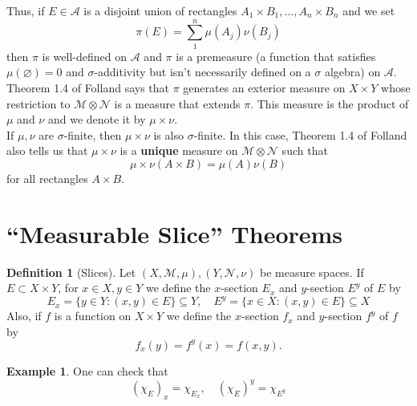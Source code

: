 \documentclass{article}
\theoremstyle{definition}
\newtheorem{exmp}{Example}[section]
\theoremstyle{theorem}
\newtheorem{definition}[theorem]{Definition}
\begin{document}
Thus, if $E \in \mathcal{A}$ is a disjoint union of rectangles $A_1\times B_1,\dots, A_n \times B_n$ and we set
\begin{equation*}
    \pi(E) = \sum^n_{1}\mu(A_j)\nu(B_j)
\end{equation*}
then $\pi$ is well-defined on $\mathcal{A}$ and $\pi$ is a premeasure (a function that satisfies $\mu(\varnothing)=0$ and $\sigma$-additivity but isn't necessarily defined on a $\sigma$ algebra) on $\mathcal{A}$. Theorem 1.4 of Folland says that $\pi$ generates an exterior measure on $X\times Y$ whose restriction to $\mathcal{M}\otimes \mathcal{N}$ is a measure that extends $\pi$. This measure is the product of  $\mu$ and $\nu$ and we denote it by  $\mu\times \nu$. \\

If $\mu,\nu$ are $\sigma$-finite, then $\mu\times \nu$ is also $\sigma$-finite. In this case, Theorem 1.4 of Folland also tells us that $\mu\times \nu$ is a \textbf{unique} measure on $\mathcal{M}\otimes \mathcal{N}$ such that 
\begin{equation*}
    \mu \times \nu (A\times B) = \mu(A) \nu(B)
\end{equation*}
for all rectangles $A\times B$. \\


\section{``Measurable Slice'' Theorems}

\begin{definition}[Slices]
Let $(X,\mathcal{M},\mu),(Y,\mathcal{N},\nu)$ be measure spaces. If $E \subset X\times Y$, for $x\in X, y\in Y$ we define the $x$-section $E_x$ and $y$-section $E^y$ of $E$ by
\begin{equation*}
    E_x = \{y\in Y : (x,y)\in E \} \subseteq Y, \quad
    E^y = \{ x\in X: (x,y)\in E \} \subseteq X
\end{equation*}
Also, if $f$ is a function on $X\times Y$ we define the $x$-section $f_x$ and $y$-section $f^y$ of $f$ by 
\begin{equation*}
    f_x(y) = f^y(x) = f(x,y).
\end{equation*}
\end{definition}


\begin{exmp} One can check that
\begin{equation*}
    (\chi_E)_x = \chi_{E_x}, \quad (\chi_E)^y = \chi_{E^y}
\end{equation*}
\end{exmp}
\end{document}
